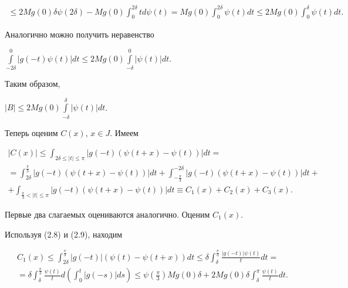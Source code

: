 \begin{pf}
\begin{multline*}
%


\le 2Mg(0)\delta\psi(2\delta)-Mg(0)\int_0^{2\delta}td\psi(t)=


Mg(0)\int_0^{2\delta}\psi(t)dt\le 2Mg(0)\int_0^\delta\psi(t)dt.


\end{multline*}


Аналогично можно получить неравенство


$\int\limits_{-2\delta}^0|g(-t)\psi(t)|dt\le


2Mg(0)\int\limits_{-\delta}^0|\psi(t)|dt$.


Таким образом,


$|B|\le 2Mg(0)\int\limits_{-\delta}^\delta|\psi(t)|dt$.


Теперь оценим $C(x)$, $x\in J$. Имеем


\begin{multline*}


|C(x)|\le\int_{2\delta\le|t|\le\pi}|g(-t)(\psi(t+x)-\psi(t))|dt= \\


%


=\int_{2\delta}^{\frac{\pi}{3}}|g(-t)(\psi(t+x)-\psi(t))|dt+


\int_{-\frac{\pi}{3}}^{-2\delta}|g(-t)(\psi(t+x)-\psi(t))|dt+ \\


%


+\int_{\frac{\pi}{3}<|t|\le\pi}|g(-t)(\psi(t+x)-\psi(t))|dt\equiv


C_1(x)+C_2(x)+C_3(x).


\end{multline*}


Первые два слагаемых оцениваются аналогично. Оценим $C_1(x)$.


Используя (2.8) и (2.9), находим


\begin{multline*}


C_1(x)\le\int_{2\delta}^{\frac{\pi}{3}}|g(-t)|(\psi(t)-\psi(t+x))dt\le


\delta\int_\delta^{\frac{\pi}{3}}\frac{|g(-t)|\psi(t)}{t}dt= \\


%


=\delta\int_\delta^{\frac{\pi}{3}}\frac{\psi(t)}{t}d\left(


\int_0^t|g(-s)|ds\right)\le \psi\left(\frac{\pi}{3}\right)Mg(0)\delta+


2Mg(0)\delta\int_\delta^\pi\frac{\psi(t)}{t}dt.


\end{multline*}



\end{pf}
